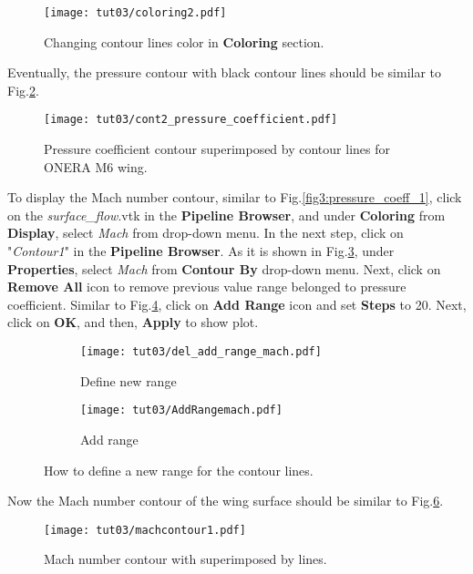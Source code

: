 \begin{figure}[htbp]
    \centering
    \texttt{[image: tut03/coloring2.pdf]}
    \caption{Changing contour lines color in \textbf{Coloring} section.}
    \label{fig3:colorby2}
\end{figure}
Eventually, the pressure contour with black contour lines should be similar to Fig.\ref{fig3:pressure_contour_lines}.
\begin{figure}[htbp]
    \centering
    \texttt{[image: tut03/cont2\_pressure\_coefficient.pdf]}
    \caption{Pressure coefficient contour superimposed by contour lines for ONERA M6 wing.}
    \label{fig3:pressure_contour_lines}
\end{figure}

To display the Mach number contour, similar to Fig.\ref{fig3:pressure_coeff_1}, click on the \textit{surface\_flow}.vtk in the \textbf{Pipeline Browser}, and under \textbf{Coloring} from \textbf{Display}, select \textit{Mach} from drop-down menu. In the next step, click on "\textit{Contour1}" in the \textbf{Pipeline Browser}. As it is shown in Fig.\ref{fig3:contourby2 a}, under \textbf{Properties}, select \textit{Mach} from \textbf{Contour By} drop-down menu. Next, click on \textbf{Remove All} icon to remove previous value range belonged to pressure coefficient. Similar to Fig.\ref{fig3:contourby2 b}, click on \textbf{Add Range} icon and set \textbf{Steps} to 20. Next, click on \textbf{OK}, and then, \textbf{Apply} to show plot.
\begin{figure}[htbp]
    \centering
     \begin{subfigure}[b]{.4\textwidth}
         \centering
         \texttt{[image: tut03/del\_add\_range\_mach.pdf]}
         \caption{Define new range}
         \label{fig3:contourby2 a}
     \end{subfigure}
     \hfill
     \begin{subfigure}[b]{.4\textwidth}
         \centering
         \texttt{[image: tut03/AddRangemach.pdf]}
         \caption{Add range}
         \label{fig3:contourby2 b}
     \end{subfigure}     
    \caption{How to define a new range for the contour lines.}
    \label{fig3:contourby2}
\end{figure}
Now the Mach number contour of the wing surface should be similar to Fig.\ref{fig3:mach_contour}.
\begin{figure}[htbp]
    \centering
    \texttt{[image: tut03/machcontour1.pdf]}
    \caption{Mach number contour with superimposed by lines.}
    \label{fig3:mach_contour}
\end{figure}
